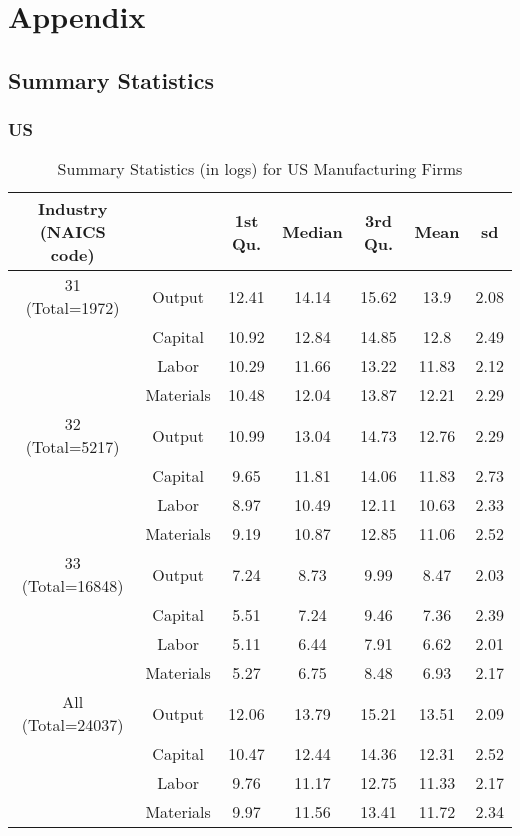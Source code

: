 \documentclass[11pt]{article}
\begin{document}



\pagebreak
\newpage

\section*{Appendix} \label{Appendix}
\subsection{Summary Statistics}

\subsubsection{US}

\begin{table}[H]
\centering
\caption{Summary Statistics (in logs) for US Manufacturing Firms}
\begin{tabular}{ccccccc}
  \hline\hline Industry (NAICS code) &   & 1st Qu. & Median & 3rd Qu. & Mean & sd \\ 
  \hline
31 (Total=1972) & Output & 12.41 & 14.14 & 15.62 & 13.9 & 2.08 \\ 
   & Capital & 10.92 & 12.84 & 14.85 & 12.8 & 2.49 \\ 
   & Labor & 10.29 & 11.66 & 13.22 & 11.83 & 2.12 \\ 
   & Materials & 10.48 & 12.04 & 13.87 & 12.21 & 2.29 \\ 
  32 (Total=5217) & Output & 10.99 & 13.04 & 14.73 & 12.76 & 2.29 \\ 
   & Capital & 9.65 & 11.81 & 14.06 & 11.83 & 2.73 \\ 
   & Labor & 8.97 & 10.49 & 12.11 & 10.63 & 2.33 \\ 
   & Materials & 9.19 & 10.87 & 12.85 & 11.06 & 2.52 \\ 
  33 (Total=16848) & Output & 7.24 & 8.73 & 9.99 & 8.47 & 2.03 \\ 
   & Capital & 5.51 & 7.24 & 9.46 & 7.36 & 2.39 \\ 
   & Labor & 5.11 & 6.44 & 7.91 & 6.62 & 2.01 \\ 
   & Materials & 5.27 & 6.75 & 8.48 & 6.93 & 2.17 \\ 
  All (Total=24037) & Output & 12.06 & 13.79 & 15.21 & 13.51 & 2.09 \\ 
   & Capital & 10.47 & 12.44 & 14.36 & 12.31 & 2.52 \\ 
   & Labor & 9.76 & 11.17 & 12.75 & 11.33 & 2.17 \\ 
   & Materials & 9.97 & 11.56 & 13.41 & 11.72 & 2.34 \\ 
   \hline
\end{tabular}
\label{USsum}
\end{table}
\end{document}
